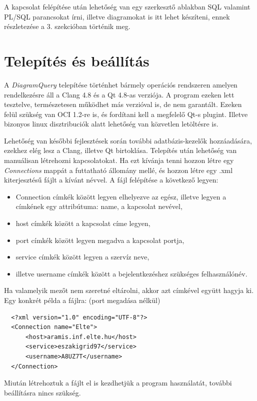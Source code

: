 \documentclass{elteikthesis}
\begin{document}
A kapcsolat felépítése után lehetőség van egy szerkesztő ablakban SQL valamint PL/SQL parancsokat írni,
illetve diagramokat is itt lehet készíteni, ennek részletezése a 3. szekcióban történik meg.

\section{Telepítés és beállítás}
A \textit{DiagramQuery} telepítése történhet bármely operációs rendszeren amelyen rendelkezésre áll a
Clang 4.8 és a Qt 4.8-as verziója. A program ezeken lett tesztelve, természetesen működhet más verzióval is,
de nem garantált. Ezeken felül szükség van OCI 1.2-re is, és fordítani kell a megfelelő Qt-s plugint.
Illetve bizonyos linux disztribuciók alatt lehetőség van közvetlen letöltésre is.

Lehetőség van későbbi fejlesztések során további adatbázis-kezelők hozzáadására, ezekhez elég lesz a Clang, illetve Qt birtoklása.
Telepítés után lehetőség van manuálisan létrehozni kapcsolatokat. Ha ezt kívánja tenni hozzon létre egy
\textit{Connections} mappát a futtatható állomány mellé, és hozzon létre egy .xml kiterjesztésű fájlt a kívánt névvel.
A fájl felépítése a következő legyen:
\begin{itemize}
  \item Connection címkék között legyen elhelyezve az egész, illetve legyen a címkének egy attribútuma: name, a kapcsolat nevével,
  \item host címkék között a kapcsolat címe legyen,
  \item port címkék között legyen megadva a kapcsolat portja,
  \item service címkék között legyen a szervíz neve,
  \item illetve username címkék között a bejelentkezéshez szükséges felhasználónév.
\end{itemize}
Ha valamelyik mezőt nem szeretné eltárolni, akkor azt címkével együtt hagyja ki.
Egy konkrét példa a fájlra: (port megadása nélkül)

\begin{lstlisting}
  <?xml version="1.0" encoding="UTF-8"?>
  <Connection name="Elte">
      <host>aramis.inf.elte.hu</host>
      <service>eszakigrid97</service>
      <username>A8UZ7T</username>
  </Connection>
\end{lstlisting}

Miután létrehoztuk a fájlt el is kezdhetjük a program használatát, további beállításra nincs szükség.
\end{document}
